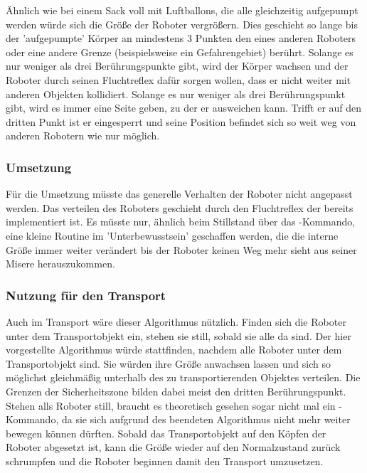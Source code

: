 Ähnlich wie bei einem Sack voll mit Luftballons, die alle gleichzeitig aufgepumpt werden würde sich die Größe der Roboter vergrößern. Dies geschieht so lange bis der 'aufgepumpte' Körper an mindestens 3 Punkten den eines anderen Roboters oder eine andere Grenze (beispielsweise ein Gefahrengebiet) berührt. Solange es nur weniger als drei Berührungspunkte gibt, wird der Körper wachsen und der Roboter durch seinen Fluchtreflex dafür sorgen wollen, dass er nicht weiter mit anderen Objekten kollidiert. Solange es nur weniger als drei Berührungspunkt gibt, wird es immer eine Seite geben, zu der er ausweichen kann. Trifft er auf den dritten Punkt ist er eingesperrt und seine Position befindet sich so weit weg von anderen Robotern wie nur möglich.

\subsubsection*{Umsetzung}
Für die Umsetzung müsste das generelle Verhalten der Roboter nicht angepasst werden. Das verteilen des Roboters geschieht durch den Fluchtreflex der bereits implementiert ist. Es müsste nur, ähnlich beim Stillstand über das -Kommando, eine kleine Routine im 'Unterbewusstsein' geschaffen werden, die die interne Größe immer weiter verändert bis der Roboter keinen Weg mehr sieht aus seiner Misere herauszukommen.

\subsubsection*{Nutzung für den Transport}
Auch im Transport wäre dieser Algorithmus nützlich. Finden sich die Roboter unter dem Transportobjekt ein, stehen sie still, sobald sie alle da sind. Der hier vorgestellte Algorithmus würde stattfinden, nachdem alle Roboter unter dem Transportobjekt sind. Sie würden ihre Größe anwachsen lassen und sich so möglichst gleichmäßig unterhalb des zu transportierenden Objektes verteilen. Die Grenzen der Sicherheitszone bilden dabei meist den dritten Berührungspunkt. Stehen alls Roboter still, braucht es theoretisch gesehen sogar nicht mal ein -Kommando, da sie sich aufgrund des beendeten Algorithmus nicht mehr weiter bewegen können dürften.
Sobald das Transportobjekt auf den Köpfen der Roboter abgesetzt ist, kann die Größe wieder auf den Normalzustand zurück schrumpfen und die Roboter beginnen damit den Transport umzusetzen.
